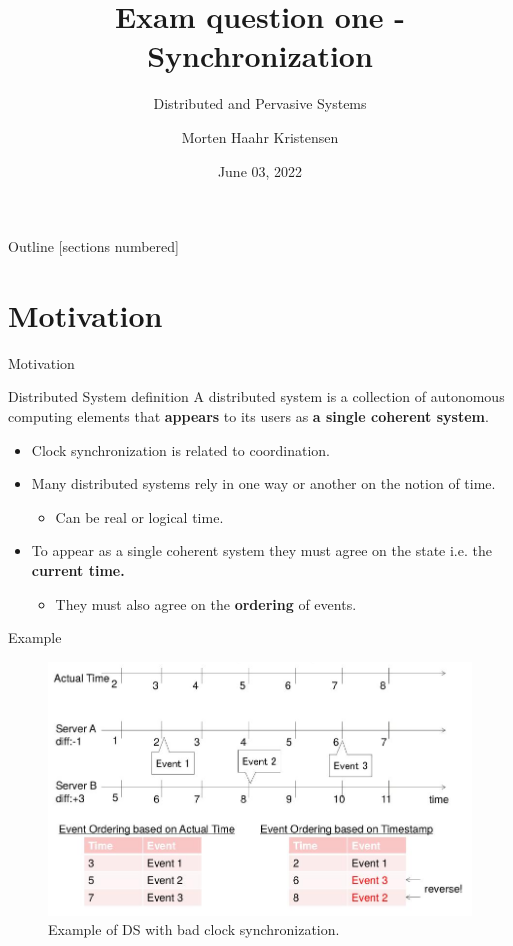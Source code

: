 \documentclass[10pt]{beamer}
\title[Synchronization]{Exam question one - Synchronization}
\subtitle{Distributed and Pervasive Systems}
\date{June 03, 2022}
\author[M.H. Kristensen]{Morten Haahr Kristensen}
\institute{Department of Electrical and Computer Engineering - Aarhus University}
\begin{document}
\maketitle

\begin{frame}{Outline}
  [sections numbered]
  \tableofcontents[hideallsubsections]
\end{frame}

\section{Motivation}

\begin{frame}{Motivation}
  \begin{alertblock}{Distributed System definition\cite{vansteenDistributedSystems2018}}
    A distributed system is a collection of autonomous computing elements that \textbf{appears} to its users as \textbf{a single coherent system}.
  \end{alertblock}
  \begin{itemize}
    \item Clock synchronization is related to coordination.
    \item Many distributed systems rely in one way or another on the notion of time.
    \begin{itemize}
      \item Can be real or logical time.
    \end{itemize}
    \item To appear as a single coherent system they must agree on the state i.e. the \textbf{current time.}
    \begin{itemize}
      \item They must also agree on the \textbf{ordering} of events.
    \end{itemize}
  \end{itemize}
\end{frame}

\begin{frame}{Example}
  \begin{figure}
    \includegraphics[width=\textwidth]{figs/bad_synchronization_example.png}
    \caption{Example of DS with bad clock synchronization.\cite{pedersenSynchronizationDistributedPervasive2022}}
  \end{figure}
\end{frame}
\end{document}
